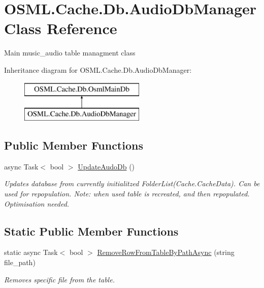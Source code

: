 \hypertarget{classOSML_1_1Cache_1_1Db_1_1AudioDbManager}{}\section{O\+S\+M\+L.\+Cache.\+Db.\+Audio\+Db\+Manager Class Reference}
\label{classOSML_1_1Cache_1_1Db_1_1AudioDbManager}


Main music\+\_\+audio table managment class  


Inheritance diagram for O\+S\+M\+L.\+Cache.\+Db.\+Audio\+Db\+Manager\+:\begin{figure}[H]
\begin{center}
\leavevmode
\includegraphics[height=2.000000cm]{classOSML_1_1Cache_1_1Db_1_1AudioDbManager}
\end{center}
\end{figure}
\subsection*{Public Member Functions}
\begin{DoxyCompactItemize}
\item 
async Task$<$ bool $>$ \mbox{\hyperlink{classOSML_1_1Cache_1_1Db_1_1AudioDbManager_aa236815a7d2ae17f4e8e4886b1a85497}{Update\+Audo\+Db}} ()
\begin{DoxyCompactList}\small\item\em Updates database from currently initialitzed Folder\+List(Cache.\+Cache\+Data). Can be used for repopulation. Note\+: when used table is recreated, and then repopulated. Optimisation needed. \end{DoxyCompactList}\end{DoxyCompactItemize}
\subsection*{Static Public Member Functions}
\begin{DoxyCompactItemize}
\item 
static async Task$<$ bool $>$ \mbox{\hyperlink{classOSML_1_1Cache_1_1Db_1_1AudioDbManager_a55cf000916b79947d45c83760f46acb1}{Remove\+Row\+From\+Table\+By\+Path\+Async}} (string file\+\_\+path)
\begin{DoxyCompactList}\small\item\em Removes specific file from the table. \end{DoxyCompactList}\end{DoxyCompactItemize}
